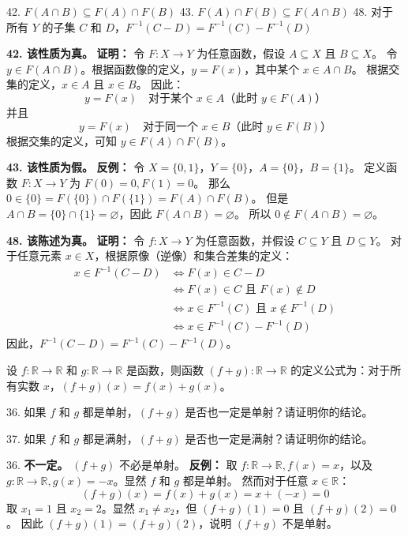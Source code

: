 \begin{questions}
42. $F(A \cap B) \subseteq F(A) \cap F(B)$
43. $F(A) \cap F(B) \subseteq F(A \cap B)$
48. 对于所有 $Y$ 的子集 $C$ 和 $D$，$F^{-1}(C - D) = F^{-1}(C) - F^{-1}(D)$

\begin{solution}
\textbf{42. 该性质为真。}
\textbf{证明：}
令 $F : X \to Y$ 为任意函数，假设 $A \subseteq X$ 且 $B \subseteq X$。
令 $y \in F(A \cap B)$。根据函数像的定义，$y = F(x)$，其中某个 $x \in A \cap B$。
根据交集的定义，$x \in A$ 且 $x \in B$。
因此：
\[
y = F(x) \quad \text{对于某个 } x \in A \text{（此时 } y \in F(A) \text{）}
\]
并且
\[
y = F(x) \quad \text{对于同一个 } x \in B \text{（此时 } y \in F(B) \text{）}
\]
根据交集的定义，可知 $y \in F(A) \cap F(B)$。

\textbf{43. 该性质为假。}
\textbf{反例：}
令 $X = \{0, 1\}$，$Y = \{0\}$，$A = \{0\}$，$B = \{1\}$。
定义函数 $F : X \to Y$ 为 $F(0) = 0, F(1) = 0$。
那么 $0 \in \{0\} = F(\{0\}) \cap F(\{1\}) = F(A) \cap F(B)$。
但是 $A \cap B = \{0\} \cap \{1\} = \varnothing$，因此 $F(A \cap B) = \varnothing$。
所以 $0 \notin F(A \cap B) = \varnothing$。

\textbf{48. 该陈述为真。}
\textbf{证明：}
令 $f : X \to Y$ 为任意函数，并假设 $C \subseteq Y$ 且 $D \subseteq Y$。
对于任意元素 $x \in X$，根据原像（逆像）和集合差集的定义：
\begin{align*}
x \in F^{-1}(C - D) &\iff F(x) \in C - D \\
&\iff F(x) \in C \text{ 且 } F(x) \notin D \\
&\iff x \in F^{-1}(C) \text{ 且 } x \notin F^{-1}(D) \\
&\iff x \in F^{-1}(C) - F^{-1}(D)
\end{align*}
因此，$F^{-1}(C - D) = F^{-1}(C) - F^{-1}(D)$。
\end{solution}

\question
设 $f: \mathbb{R} \to \mathbb{R}$ 和 $g: \mathbb{R} \to \mathbb{R}$ 是函数，则函数 $(f + g): \mathbb{R} \to \mathbb{R}$ 的定义公式为：对于所有实数 $x$，$(f + g)(x) = f(x) + g(x)$。

36. 如果 $f$ 和 $g$ 都是单射，$(f + g)$ 是否也一定是单射？请证明你的结论。

37. 如果 $f$ 和 $g$ 都是满射，$(f + g)$ 是否也一定是满射？请证明你的结论。

\begin{solution}
36. \textbf{不一定。} $(f + g)$ 不必是单射。
\textbf{反例：}
取 $f: \mathbb{R} \to \mathbb{R}, f(x) = x$，以及 $g: \mathbb{R} \to \mathbb{R}, g(x) = -x$。显然 $f$ 和 $g$ 都是单射。
然而对于任意 $x \in \mathbb{R}$：
\[
(f + g)(x) = f(x) + g(x) = x + (-x) = 0
\]
取 $x_1 = 1$ 且 $x_2 = 2$。显然 $x_1 \neq x_2$，但 $(f + g)(1) = 0$ 且 $(f + g)(2) = 0$。
因此 $(f + g)(1) = (f + g)(2)$，说明 $(f + g)$ 不是单射。


\end{solution}
\end{questions}
